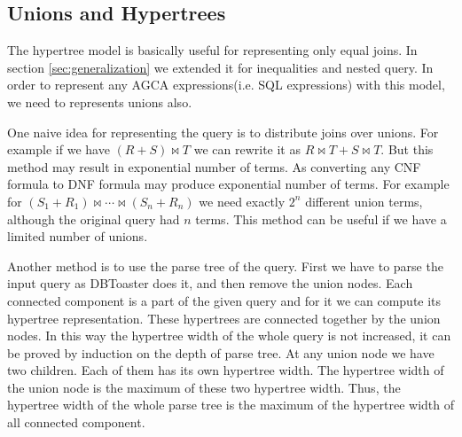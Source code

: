 \documentclass[12pt]{article}
\begin{document}
\subsection{Unions and Hypertrees}
\label{sec:unionsand}
The hypertree model is basically useful for representing only equal joins. In section \ref{sec:generalization} we extended it for inequalities and nested query. In order to represent any AGCA expressions(i.e. SQL expressions) with this model, we need to represents unions also. \par
One naive idea for representing the query is to distribute joins over unions. For example if we have $(R+S)\Join T$ we can rewrite it as $R\Join T+S\Join T$. But this method may result in exponential number of terms. As converting any CNF formula to DNF formula may produce exponential number of terms. For example for $(S_{1}+R_{1})\Join\cdots\Join(S_{n}+R_{n})$ we need exactly $2^{n}$ different union terms, although the original query had $n$ terms. 
This method can be useful if we have a limited number of unions. \\\par
Another method is to use the parse tree of the query. First we have to parse the input query as DBToaster does it, and then remove the union nodes. Each connected component is a part of the given query and for it we can compute its hypertree representation. These hypertrees are connected together by the union nodes. In this way the hypertree width of the whole query is not increased, it can be proved  by induction on the depth of parse tree. At any union node we have two children. Each of them has its own hypertree width. The hypertree width of the union node is the maximum of these two hypertree width. Thus, the hypertree width of the whole parse tree is the maximum of the hypertree width of all connected component.
\end{document}
